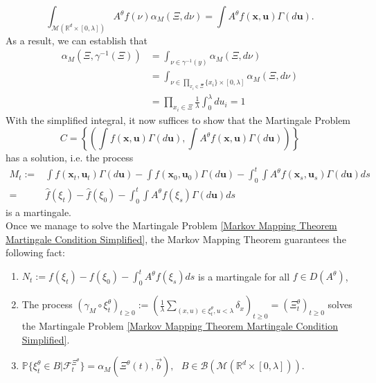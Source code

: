 \documentclass[12pt]{article}
\def \hat{\widehat}
\newcommand{\IR}{\mathbb R}
\newcommand{\meanq}{\vec b}    %
\begin{document}
\begin{equation}
\int_{\mathcal{M}(\IR^d\times [0,\lambda])}A^{\theta}f(\nu)\alpha_M(\Xi,d\nu)= \int   A^{\theta}f(\textbf{x},\textbf{u})\Gamma(d\textbf{u}). 
\end{equation}
As a result, we can establish that
\begin{equation}
\begin{aligned}
\alpha_M(\Xi,\gamma^{-1}(\Xi)) &= \int_{\nu \in \gamma^{-1}(y)}\alpha_M (\Xi,d\nu) \\
&= \int_{\nu \in \prod_{x_i \in \Xi} \{x_i\}\times [0,\lambda]}\alpha_M (\Xi,d\nu)\\
&= \prod_{x_i \in \Xi}\frac{1}{\lambda}\int_{0}^{\lambda} du_i =1
\end{aligned}
\end{equation}
With the simplified integral, it now suffices to show that the Martingale Problem 
\begin{equation}\label{Markov Mapping Theorem Martingale Condition Simplified}
C = \left\{\left(\int   f(\textbf{x},\textbf{u})\Gamma(d\textbf{u}),\int   A^{\theta}f(\textbf{x},\textbf{u})\Gamma(d\textbf{u})\right)\right\}    
\end{equation}
has a solution, i.e. the process
\begin{equation}
\begin{aligned}
M_t:=& \int   f(\textbf{x}_t,\textbf{u}_t)\Gamma(d\textbf{u})-\int   f(\textbf{x}_0,\textbf{u}_0)\Gamma(d\textbf{u})-\int_{0}^{t}\int   A^{\theta}f(\textbf{x}_s,\textbf{u}_s)\Gamma(d\textbf{u})ds\\
=&\hat{f}(\xi_t)-\hat{f}(\xi_0)-\int_{0}^{t}\int   A^{\theta}f(\xi_s)\Gamma(d\textbf{u})ds
\end{aligned}    
\end{equation}
is a martingale.\\
Once we manage to solve the Martingale Problem \eqref{Markov Mapping Theorem Martingale Condition Simplified}, the Markov Mapping Theorem guarantees the following fact:
\begin{enumerate}
    \item $N_t:=    f(\xi_t)-   f(\xi_0)-\int_{0}^{t}  A^{\theta}f(\xi_s)ds$ is a martingale for all $f\in D(A^{\theta})$,
    \item The process $(\gamma_M \circ \xi^{\theta}_t)_{t \geq 0}:= \left(\frac{1}{\lambda}\sum_{(x,u)\in \xi^{\theta}_t, u < \lambda} \delta_x\right)_{t \geq 0}=(\Xi^{\theta}_t)_{t \geq 0}$ solves the Martingale Problem \eqref{Markov Mapping Theorem Martingale Condition Simplified}.
    \item $\mathbb{P}\{\xi^{\theta}_t \in B | \mathcal{F}^{\Xi^{\theta}}_t\}=\alpha_M(\Xi^{\theta}(t),\meanq), ~~~B \in \mathcal{B}(\mathcal{M}(\IR^d \times [0,\lambda])).$
\end{enumerate}
\end{document}
